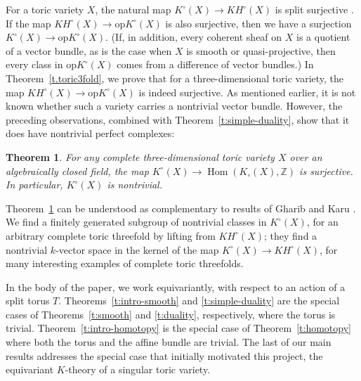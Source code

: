 \documentclass[11pt]{amsart}
\newtheorem{theorem}{Theorem}[section]
\theoremstyle{definition}
\begin{document}
For a toric variety $X$, the natural map $K^\circ(X) \rightarrow KH^\circ(X)$ is split surjective \cite[Proposition~5.6]{chww}.  If the map $KH^\circ(X) \to {\mathrm{op}K}^\circ(X)$ is also surjective, then we have a surjection $K^\circ(X) \to {\mathrm{op}K}^\circ(X)$.  (If, in addition, every coherent sheaf on $X$ is a quotient of a vector bundle, as is the case when $X$ is smooth or quasi-projective, then every class in ${\mathrm{op}K}^\circ(X)$ comes from a difference of vector bundles.)  In Theorem~\ref{t.toric3fold}, we prove that for a three-dimensional toric variety, the map $KH^\circ(X) \to {\mathrm{op}K}^\circ(X)$ is indeed surjective.  As mentioned earlier, it is not known whether such a variety carries a nontrivial vector bundle.  However, the preceding observations, combined with Theorem~\ref{t:simple-duality}, show that it does have nontrivial perfect complexes:

\begin{theorem}\label{t.toric-nontrivial}
For any complete three-dimensional toric variety $X$ over an algebraically closed field, the map $K^\circ(X) \to \operatorname{Hom}(K_\circ(X),{\mathbb{Z}})$ is surjective.  In particular, $K^\circ(X)$ is nontrivial.
\end{theorem}

Theorem~\ref{t.toric-nontrivial} can be understood as complementary to results of Gharib and Karu \cite{gharib-karu}.  We find a finitely generated subgroup of nontrivial classes in $K^\circ(X)$, for an arbitrary complete toric threefold by lifting from $KH^\circ(X)$; they find a nontrivial $k$-vector space in the kernel of the map $K^\circ(X) \to KH^\circ(X)$, for many interesting examples of complete toric threefolds.

In the body of the paper, we work equivariantly, with respect to an action of a split torus $T$.  Theorems~\ref{t:intro-smooth} and \ref{t:simple-duality} are the special cases of Theorems~\ref{t:smooth} and \ref{t:duality}, respectively, where the torus is trivial.  Theorem~\ref{t:intro-homotopy} is the special case of Theorem~\ref{t:homotopy} where both the torus and the affine bundle are trivial.  The last of our main results addresses the special case that initially motivated this project, the equivariant $K$-theory of a singular toric variety.
\end{document}
